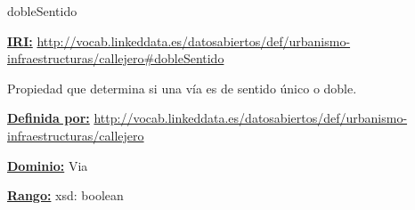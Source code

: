 \begin{mybox}{dobleSentido}
\begin{flushleft}
\underline{\textbf{IRI:}}
\url{http://vocab.linkeddata.es/datosabiertos/def/urbanismo-infraestructuras/callejero#dobleSentido}
\newline

Propiedad que determina si una vía es de sentido único o doble.
\newline

\underline{\textbf{Definida por:}}\newline
\url{http://vocab.linkeddata.es/datosabiertos/def/urbanismo-infraestructuras/callejero}
\newline

\underline{\textbf{Dominio:}}
		Via
\newline

\underline{\textbf{Rango:}}
 xsd: boolean
 \newline

\end{flushleft}
\end{mybox}












